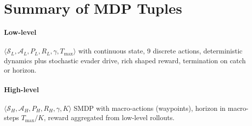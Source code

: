 \documentclass[11pt]{article}
\begin{document}
\section{Summary of MDP Tuples}
\paragraph{Low-level} $\langle \mathcal{S}_L, \mathcal{A}_L, P_L, R_L, \gamma, T_{\max}\rangle$ with continuous state, 9 discrete actions, deterministic dynamics plus stochastic evader drive, rich shaped reward, termination on catch or horizon.

\paragraph{High-level} $\langle \mathcal{S}_H, \mathcal{A}_H, P_H, R_H, \gamma, K\rangle$ SMDP with macro-actions (waypoints), horizon in macro-steps $T_{\max}/K$, reward aggregated from low-level rollouts.
\end{document}
